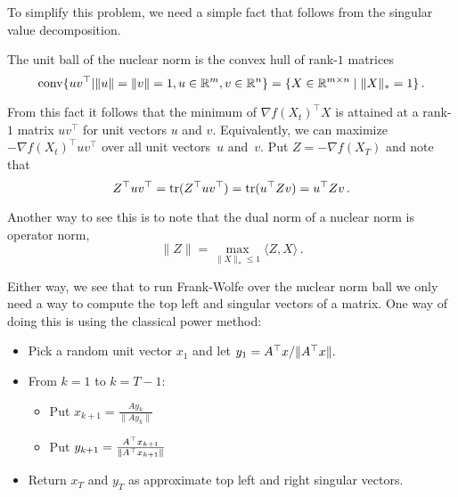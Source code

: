 To simplify this problem, we need a simple fact that follows from the singular
value decomposition.
%
\begin{fact}
The unit ball of the nuclear norm is the convex hull of rank-$1$ matrices
\[
\mathrm{conv}\{uv^\top|\|u\|=\|v\|=1, u\in\mathbb{R}^m, v\in\mathbb{R}^n\}
=\{X\in\mathbb{R}^{m\times n}\mid \|X\|_*=1\}\,.
\]
\end{fact}

From this fact it follows that the minimum of $\nabla f(X_t)^\top X$ is attained
at a rank-$1$ matrix $uv^\top$ for unit vectors $u$ and $v$. 
Equivalently, we can maximize $-\nabla f(X_t)^\top uv^\top$ 
over all unit vectors~$u$ and~$v.$ Put
$Z = -\nabla f(X_T)$ and note that
\[
Z^\top uv^\top = \mathrm{tr}(Z^\top uv^\top) = \mathrm{tr}(u^\top Z v) = u^\top Z v\,.
\]

Another way to see this is to note that 
the dual norm of a nuclear norm is operator norm,
\[
\|Z\| = \max_{\|X\|_*\leq 1}\langle Z, X\rangle\,.
\]

Either way, we see that to run Frank-Wolfe over the nuclear norm ball we only
need a way to compute the top left and singular vectors of a matrix. One way of
doing this is using the classical power method:

\begin{itemize}
\item Pick a random unit vector $x_1$ and let $y_1 = A^\top x/\|A^\top x\|.$
\item From $k=1$ to $k=T-1:$
\begin{itemize}
\item Put $x_{k+1}=\frac{Ay_k}{\|Ay_k\|}$
\item Put $y_{k+1}=\frac{A^\top x_{k+1}}{\|A^\top x_{k+1}\|}$
\end{itemize}
\item Return $x_T$ and $y_T$ 
as approximate top left and right singular vectors.
\end{itemize}
